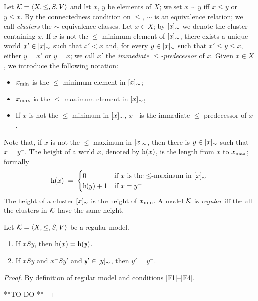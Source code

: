 Let $\mathcal{K}=\langle X,\leq,S,V \rangle$ and let $x$, $y$ be elements of $X$; we set
$x\sim y$ iff $x\leq y$ or $y\leq x$. By the connectedness condition
on $\leq$, $\sim$ is an equivalence relation; we call \emph{clusters}
the $\sim$-equivalence classes.
Let $x\in X$;  by $[x]_\sim$ we denote the cluster containing $x$.
If $x$ is not the   $\leq$-minimum element of $[x]_\sim$,
there exists a unique world $x'\in[x]_\sim$ such that
$x' < x$ and, for
every $y\in [x]_\sim$ such that $x'\leq y \leq x$, either $y=x'$ or $y =x$;
we call $x'$ the \emph{immediate $\leq$-predecessor} of $x$. 
Given $x\in X$,
we introduce the following notation:  
\begin{itemize}
\item $x_{\mathrm{min}}$  is the $\leq$-minimum element in $[x]_\sim$;
\item  $x_{\mathrm{max}}$ is the $\leq$-maximum element in $[x]_\sim$;

\item  If $x$ is not the $\leq$-minimum in $[x]_\sim$,  $x^-$  is the immediate $\leq$-predecessor
  of $x$.
  
\end{itemize}
Note that, if $x$ is not the  $\leq$-maximum in  $[x]_\sim$, then there is $y\in[x]_\sim$ such that
$x = y^-$.
The height of a world $x$, denoted by $\mathrm{h}(x)$, is the length 
from $x$ to $x_{\mathrm{max}}$; formally
\[
  \mathrm{h}(x)\;=\;
  \begin{cases}
0 &\text{if $x$ is the $\leq$-maximum in $[x]_\sim$}    
\\
 \mathrm{h}(y) + 1 & \text{if  $x =y^-$}
  \end{cases}
\]
The height of a cluster $[x]_\sim$ is the height of $x_{\mathrm{min}}$.
A model $\mathcal{K}$ is \emph{regular} iff the all the clusters in $\mathcal{K}$ have the same height.


\begin{lemma}\label{lemma:reg}
  Let   $\mathcal{K}=\langle X,\leq,S,V \rangle$ be a regular model.
\begin{enumerate}[label=(\roman*), ref=(\roman*),leftmargin=*]
\item\label{lemma:reg:1}
  If $ x S y$, then $\mathrm{h}(x)=\mathrm{h}(y)$.

\item\label{lemma:reg:2}
If $x S y$ and  $x^- S y'$ and $y'\in[y]_\sim$, then $y'=y^-$.
  
 \end{enumerate}
\end{lemma}

\begin{proof}
    By definition of regular model and conditions \ref{F1}--\ref{F4}.

    **TO DO **
  \end{proof}


